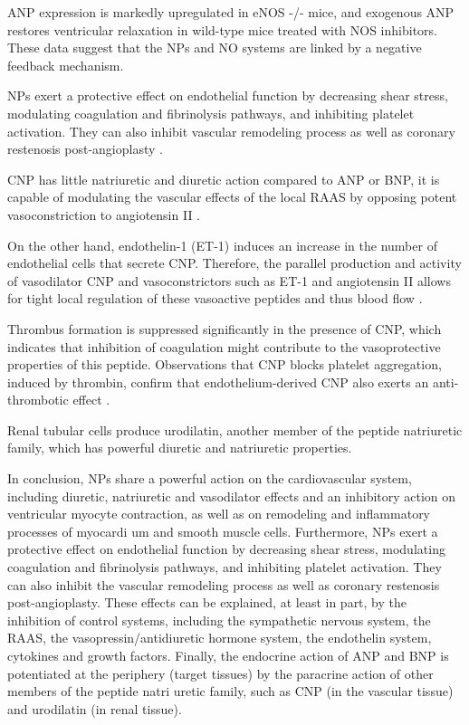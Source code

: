 \documentclass[14pt,a4paper,onecolumn]{extarticle}
\begin{document}
ANP expression is markedly upregulated in eNOS -/- mice, and exogenous ANP restores ventricular relaxation in wild-type mice treated with NOS inhibitors. These data suggest that the NPs and NO systems are linked by a negative feedback mechanism.  \citep{118}

NPs exert a protective effect on endothelial function by decreasing shear stress, modulating coagulation and fibrinolysis pathways, and inhibiting platelet activation. They can also inhibit vascular remodeling process as well as coronary restenosis post-angioplasty \citep{89}.

CNP has little natriuretic and diuretic action compared to ANP or BNP, it is capable of modulating the vascular effects of the local RAAS by opposing potent vasoconstriction to angiotensin II \citep{269}.

On the other hand, endothelin-1 (ET-1) induces an increase in the number of endothelial cells that secrete CNP. Therefore, the parallel production and activity of vasodilator CNP and vasoconstrictors such as ET-1 and angiotensin II allows for tight local regulation of these vasoactive peptides and thus blood flow \citep{279}.

Thrombus formation is suppressed significantly in the presence of CNP, which indicates that inhibition of coagulation might contribute to the vasoprotective properties of this peptide. Observations that CNP blocks platelet aggregation, induced by thrombin, confirm that endothelium-derived CNP also exerts an anti-thrombotic effect \citep{267}. %

Renal tubular cells produce urodilatin, another member of the peptide natriuretic family, which has powerful diuretic and natriuretic properties. \citep{100}

In conclusion, NPs share a powerful action on the cardiovascular system, including diuretic, natriuretic and vasodilator effects and an inhibitory action on ventricular myocyte contraction, as well as on remodeling and inflammatory processes of myocardi um and smooth muscle cells. Furthermore, NPs exert a protective effect on endothelial function by decreasing shear stress, modulating coagulation and fibrinolysis pathways, and inhibiting platelet activation. They can also inhibit the vascular remodeling process as well as coronary restenosis post-angioplasty. These effects can be explained, at least in part, by the inhibition of control systems, including the sympathetic nervous system, the RAAS, the vasopressin/antidiuretic hormone system, the endothelin system, cytokines and growth factors. Finally, the endocrine action of ANP and BNP is potentiated at the periphery (target tissues) by the paracrine action of other members of the peptide natri uretic family, such as CNP (in the vascular tissue) and urodilatin (in renal tissue).
\end{document}
